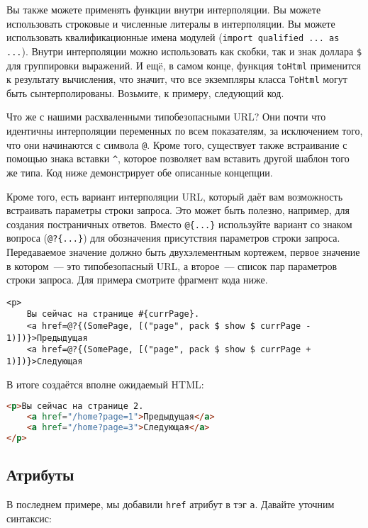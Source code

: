 Вы также можете применять функции внутри интерполяции. Вы можете использовать
строковые и численные литералы в интерполяции. Вы можете использовать
квалификационные имена модулей (\lstinline!import qualified ... as ...!). Внутри
интерполяции можно использовать как скобки, так и знак доллара \texttt{\$}
для группировки выражений. И ещë, в самом конце, функция \lstinline!toHtml!
применится к результату вычисления, что значит, что все экземпляры класса
\lstinline!ToHtml! могут быть сынтерполированы. Возьмите, к примеру, следующий код.


Что же с нашими расхваленными типобезопасными URL? Они почти что идентичны
интерполяции переменных по всем показателям, за исключением того, что они
начинаются с символа \texttt{@}. Кроме того, существует также встраивание с помощью
знака вставки \verb'^', которое позволяет вам вставить другой шаблон того же типа.
Код ниже демонстрирует обе описанные концепции.


Кроме того, есть вариант интерполяции URL, который даёт вам возможность
встраивать параметры строки запроса. Это может быть полезно, например, для
создания постраничных ответов. Вместо \lstinline'@{...}' используйте вариант со
знаком вопроса (\lstinline'@?{...}') для обозначения присутствия параметров
строки запроса. Передаваемое значение должно быть двухэлементным кортежем,
первое значение в котором~--- это типобезопасный URL, а второе~--- список пар
параметров строки запроса. Для примера смотрите фрагмент кода ниже.
\begin{lstlisting}[caption=Интерполяция URL с параметрами в строке запроса]
<p>
    Вы сейчас на странице #{currPage}.
    <a href=@?{(SomePage, [("page", pack $ show $ currPage - 1)])}>Предыдущая
    <a href=@?{(SomePage, [("page", pack $ show $ currPage + 1)])}>Следующая
\end{lstlisting}
В итоге создаётся вполне ожидаемый HTML:
\begin{lstlisting}[language=HTML]
<p>Вы сейчас на странице 2.
    <a href="/home?page=1">Предыдущая</a>
    <a href="/home?page=3">Следующая</a>
</p>
\end{lstlisting}

\subsection{Атрибуты}
В последнем примере, мы добавили \texttt{href} атрибут в тэг \texttt{a}. Давайте
уточним синтаксис:

